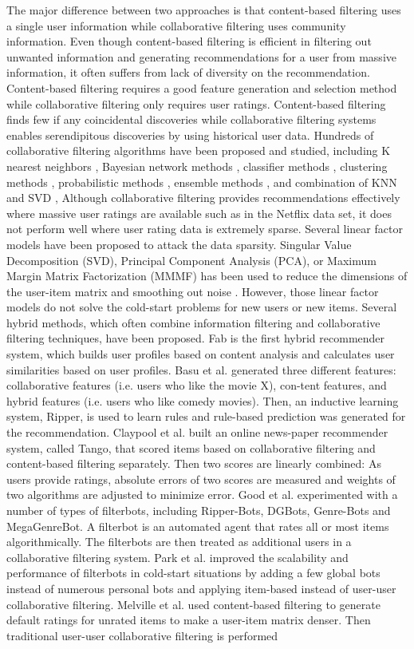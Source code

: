 \documentclass[document.tex]{subfiles}
\begin{document}
The major difference between two approaches is that content-based filtering uses a single user information while collaborative filtering uses community information. Even though content-based filtering is efficient in filtering out unwanted information and generating recommendations for a user from massive information, it often suffers from lack of diversity on the recommendation. Content-based filtering requires a good feature generation and selection method while collaborative filtering only requires user ratings. Content-based filtering finds few if any coincidental discoveries while collaborative filtering systems enables serendipitous discoveries by using historical user data. Hundreds of collaborative filtering algorithms have been proposed and studied, including K nearest neighbors \cite{a3,a4,a5}, Bayesian network methods \cite{a6}, classifier methods \cite{a7}, clustering methods \cite{a8}, probabilistic methods \cite{a9,a10}, ensemble methods \cite{a11}, and combination of KNN and SVD \cite{a12}, Although collaborative filtering provides recommendations effectively where massive user ratings are available such as in the Netflix data set, it does not perform well where user rating data is extremely sparse. Several linear factor models have been proposed to attack the data sparsity. Singular Value Decomposition (SVD), Principal Component Analysis (PCA), or Maximum Margin Matrix Factorization (MMMF) has been used to reduce the dimensions of the user-item matrix and smoothing out noise \cite{a7,a13,a14}. However, those linear factor models do not solve the cold-start problems for new users or new items. Several hybrid methods, which often combine information filtering and collaborative filtering techniques, have been proposed. Fab \cite{a15} is the first hybrid recommender system, which builds user profiles based on content analysis and calculates user similarities based on user profiles. Basu et al. \cite{a16} generated three different features: collaborative features (i.e. users who like the movie X), con-tent features, and hybrid features (i.e. users who like comedy movies). Then, an inductive learning system, Ripper, is used to learn rules and rule-based prediction was generated for the recommendation. Claypool et al. \cite{a17} built an online news-paper recommender system, called Tango, that scored items based on collaborative filtering and content-based filtering separately. Then two scores are linearly combined: As users provide ratings, absolute errors of two scores are measured and weights of two algorithms are adjusted to minimize error. Good et al.\cite{a18} experimented with a number of types of filterbots, including Ripper-Bots, DGBots, Genre-Bots and MegaGenreBot. A filterbot is an automated agent that rates all or most items algorithmically. The filterbots are then treated as additional users in a collaborative filtering system. Park et al.\cite{a19} improved the scalability and performance of filterbots in cold-start situations by adding a few global bots instead of numerous personal bots and applying item-based instead of user-user collaborative filtering. Melville et al.\cite{a20} used content-based filtering to generate default ratings for unrated items to make a user-item matrix denser. Then traditional user-user collaborative filtering is performed 
\end{document}
